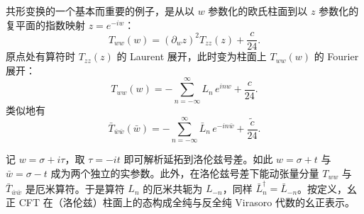 
共形变换的一个基本而重要的例子，是从以 $w$ 参数化的欧氏柱面到以 $z$ 参数化的复平面的指数映射 $z=e^{-iw}$：
\begin{equation}
  \label{eq:2-9}
  T_{ww}(w)=(\partial_w z)^2T_{zz}(z)+\frac{c}{24}.
\end{equation}
原点处有算符时 $T_{zz}(z)$ 的 Laurent 展开，此时变为柱面上 $T_{ww}(w)$ 的 Fourier 展开：
\begin{equation}
  \label{eq:2-10}
  T_{ww}(w)=-\sum_{n=-\infty}^{\infty}L_n\,e^{inw}+\frac{c}{24}.
\end{equation}
类似地有
\begin{equation}
  \label{eq:2-11}
  \bar T_{\bar w\bar w}(\bar w)=-\sum_{n=-\infty}^{\infty}\bar L_n\,e^{-in\bar w}+\frac{\tilde c}{24}.
\end{equation}


记 $w=\sigma+i\tau$，取 $\tau=-it$ 即可解析延拓到洛伦兹号差。如此 $w=\sigma+t$ 与 $\bar w=\sigma-t$ 成为两个独立的实参数。此外，在洛伦兹号差下能动张量分量 $T_{ww}$ 与 $\bar T_{\bar w\bar w}$ 是厄米算符。于是算符 $L_n$ 的厄米共轭为 $L_{-n}$，同样 $\bar L_n^{\dagger}=\bar L_{-n}$。按定义，幺正 CFT 在（洛伦兹）柱面上的态构成全纯与反全纯 Virasoro 代数的幺正表示。
